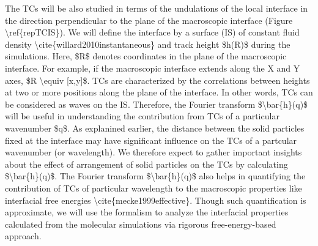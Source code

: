 \par The TCs will be also studied in terms of the undulations of the local interface in the direction perpendicular to the plane of the macroscopic interface (Figure \textbackslash ref\{repTCIS\}). We will define the interface by a surface (IS) of constant fluid density \textbackslash cite\{willard2010instantaneous\} and track height \$h(R)\$ during the simulations. Here, \$R\$ denotes coordinates in the plane of the macroscopic interface. For example, if the macroscopic interface extends along the X and Y axes, \$R \textbackslash equiv [x,y]\$. TCs are characterized by the correlations between heights at two or more positions along the plane of the interface. In other words, TCs can be considered as waves on the IS. Therefore, the Fourier transform \$\textbackslash bar\{h\}(q)\$ will be useful in understanding the contribution from TCs of a particular wavenumber \$q\$. As explanined earlier, the distance between the solid particles fixed at the interface may have significant influence on the TCs of a partcular wavenumber (or wavelength). We therefore  expect to gather important insights about the effect of arrangement of solid particles on the TCs by calculating \$\textbackslash bar\{h\}(q)\$. The Fourier transform \$\textbackslash bar\{h\}(q)\$ also helps in quantifying the contribution of TCs of particular wavelength to the macroscopic properties like interfacial free energies \textbackslash cite\{mecke1999effective\}. Though such quantification is approximate, we will use the formalism to analyze the interfacial properties calculated from the molecular simulations via rigorous free-energy-based approach.
